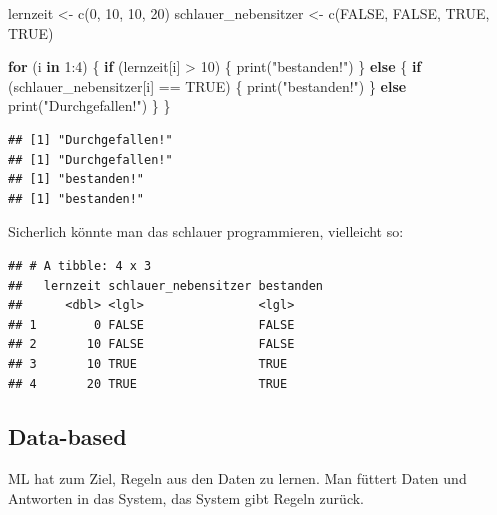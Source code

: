 \documentclass[
]{book}
\newenvironment{Shaded}{\begin{snugshade}}{\end{snugshade}}
\newcommand{\ConstantTok}[1]{\textcolor[rgb]{0.00,0.00,0.00}{#1}}
\newcommand{\ControlFlowTok}[1]{\textcolor[rgb]{0.13,0.29,0.53}{\textbf{#1}}}
\newcommand{\DecValTok}[1]{\textcolor[rgb]{0.00,0.00,0.81}{#1}}
\newcommand{\FunctionTok}[1]{\textcolor[rgb]{0.00,0.00,0.00}{#1}}
\newcommand{\NormalTok}[1]{#1}
\newcommand{\OtherTok}[1]{\textcolor[rgb]{0.56,0.35,0.01}{#1}}
\newcommand{\SpecialCharTok}[1]{\textcolor[rgb]{0.00,0.00,0.00}{#1}}
\newcommand{\StringTok}[1]{\textcolor[rgb]{0.31,0.60,0.02}{#1}}
\begin{document}
\begin{Shaded}
\begin{Highlighting}[]
\NormalTok{lernzeit }\OtherTok{\textless{}{-}} \FunctionTok{c}\NormalTok{(}\DecValTok{0}\NormalTok{, }\DecValTok{10}\NormalTok{, }\DecValTok{10}\NormalTok{, }\DecValTok{20}\NormalTok{)}
\NormalTok{schlauer\_nebensitzer }\OtherTok{\textless{}{-}} \FunctionTok{c}\NormalTok{(}\ConstantTok{FALSE}\NormalTok{, }\ConstantTok{FALSE}\NormalTok{, }\ConstantTok{TRUE}\NormalTok{, }\ConstantTok{TRUE}\NormalTok{)}

\ControlFlowTok{for}\NormalTok{ (i }\ControlFlowTok{in} \DecValTok{1}\SpecialCharTok{:}\DecValTok{4}\NormalTok{) \{}
  \ControlFlowTok{if}\NormalTok{ (lernzeit[i] }\SpecialCharTok{\textgreater{}} \DecValTok{10}\NormalTok{) \{}
    \FunctionTok{print}\NormalTok{(}\StringTok{"bestanden!"}\NormalTok{)}
\NormalTok{  \} }\ControlFlowTok{else}\NormalTok{ \{}
    \ControlFlowTok{if}\NormalTok{ (schlauer\_nebensitzer[i] }\SpecialCharTok{==} \ConstantTok{TRUE}\NormalTok{) \{}
      \FunctionTok{print}\NormalTok{(}\StringTok{"bestanden!"}\NormalTok{)}
\NormalTok{    \} }\ControlFlowTok{else} \FunctionTok{print}\NormalTok{(}\StringTok{"Durchgefallen!"}\NormalTok{)}
\NormalTok{  \}}
\NormalTok{\}}
\end{Highlighting}
\end{Shaded}

\begin{verbatim}
## [1] "Durchgefallen!"
## [1] "Durchgefallen!"
## [1] "bestanden!"
## [1] "bestanden!"
\end{verbatim}

Sicherlich könnte man das schlauer programmieren, vielleicht so:

\begin{verbatim}
## # A tibble: 4 x 3
##   lernzeit schlauer_nebensitzer bestanden
##      <dbl> <lgl>                <lgl>    
## 1        0 FALSE                FALSE    
## 2       10 FALSE                FALSE    
## 3       10 TRUE                 TRUE     
## 4       20 TRUE                 TRUE
\end{verbatim}

\hypertarget{data-based}{%
\subsection{Data-based}\label{data-based}}

ML hat zum Ziel, Regeln aus den Daten zu lernen. Man füttert Daten und Antworten in das System, das System gibt Regeln zurück.
\end{document}
